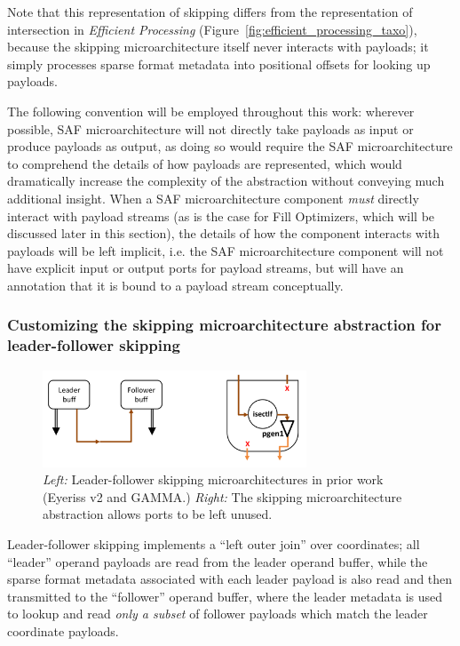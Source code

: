 Note that this representation of skipping differs from the representation of intersection in \textit{Efficient Processing} (Figure~\ref{fig:efficient_processing_taxo}), because the skipping microarchitecture itself never interacts with payloads; it simply processes sparse format metadata into positional offsets for looking up payloads. 

The following convention will be employed throughout this work: wherever possible, SAF microarchitecture will not directly take payloads as input or produce payloads as output, as doing so would require the SAF microarchitecture to comprehend the details of how payloads are represented, which would dramatically increase the complexity of the abstraction without conveying much additional insight. When a SAF microarchitecture component \textit{must} directly interact with payload streams (as is the case for Fill Optimizers, which will be discussed later in this section), the details of how the component interacts with payloads will be left implicit, i.e. the SAF microarchitecture component will not have explicit input or output ports for payload streams, but will have an annotation that it is bound to a payload stream conceptually.

\subsubsection{Customizing the skipping microarchitecture abstraction for leader-follower skipping}
\label{sec:skipping_lf}

\begin{figure}[ht]
    \centering
    \includegraphics[width=0.7\textwidth]{figures/prior_lf_skip.pdf}
    \caption{\textit{Left:} Leader-follower skipping microarchitectures in prior work (Eyeriss v2\cite{eyerissv2} and GAMMA\cite{gamma}.) \textit{Right:} The skipping microarchitecture abstraction allows ports to be left unused.}
    \label{fig:prior_lf_skip}
\end{figure}

Leader-follower skipping\cite{sparseloop} implements a ``left outer join'' over coordinates; all ``leader'' operand payloads are read from the leader operand buffer, while the sparse format metadata associated with each leader payload is also read and then transmitted to the ``follower'' operand buffer, where the leader metadata is used to lookup and read \textit{only a subset} of follower payloads which match the leader coordinate payloads. 


